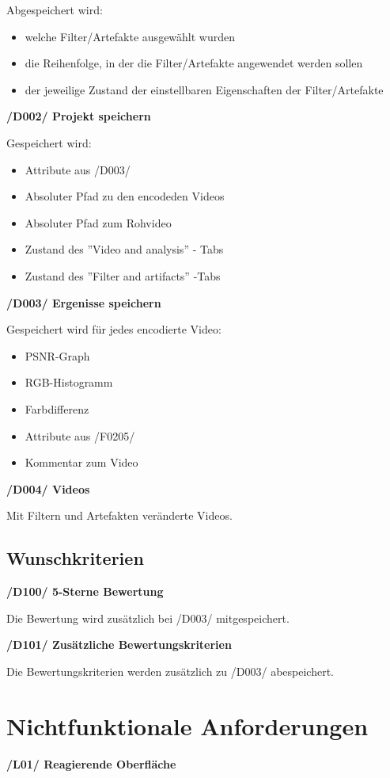 \documentclass[parskip=full]{scrartcl}
\begin{document}
Abgespeichert wird:
\begin{itemize}
\item welche Filter/Artefakte ausgewählt wurden
\item die Reihenfolge, in der die Filter/Artefakte angewendet werden sollen
\item der jeweilige Zustand der einstellbaren Eigenschaften der Filter/Artefakte
\end{itemize}


\textbf{/D002/ Projekt speichern}

Gespeichert wird:
\begin{itemize}
\item Attribute aus /D003/
\item Absoluter Pfad zu den encodeden Videos
\item Absoluter Pfad zum Rohvideo
\item Zustand des ''Video and analysis'' - Tabs
\item Zustand des ''Filter and artifacts'' -Tabs
\end{itemize}

\textbf{/D003/ Ergenisse speichern}

Gespeichert wird für jedes encodierte Video:
\begin{itemize}
\item PSNR-Graph
\item RGB-Histogramm
\item Farbdifferenz
\item Attribute aus /F0205/
\item Kommentar zum Video
\end{itemize}

\textbf{/D004/ Videos}

Mit Filtern und Artefakten veränderte Videos.

\subsection{Wunschkriterien}
\textbf{/D100/ 5-Sterne Bewertung}

Die Bewertung wird zusätzlich bei /D003/ mitgespeichert.

\textbf{/D101/ Zusätzliche Bewertungskriterien}

Die Bewertungskriterien werden zusätzlich zu /D003/ abespeichert.


\newpage
\section{Nichtfunktionale Anforderungen}
\textbf{/L01/ Reagierende Oberfläche}
\end{document}

